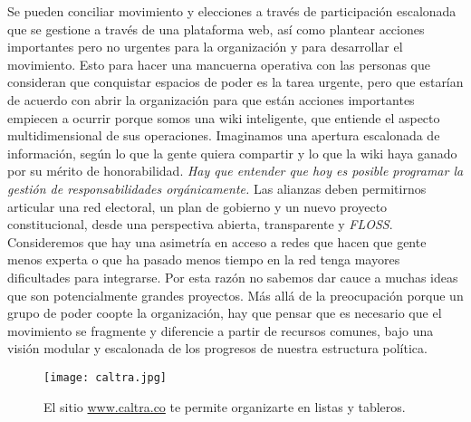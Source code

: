 Se pueden conciliar movimiento y elecciones a través de participación escalonada que se gestione a través de una plataforma web, así como plantear acciones importantes pero no urgentes para la organización y para desarrollar el movimiento. Esto para hacer una mancuerna operativa con las personas que consideran que conquistar espacios de poder es la tarea urgente, pero que estarían de acuerdo con abrir la organización para que están acciones importantes empiecen a ocurrir porque somos una wiki inteligente, que entiende el aspecto multidimensional de sus operaciones. Imaginamos una apertura escalonada de información, según lo que la gente quiera compartir y lo que la wiki haya ganado por su mérito de honorabilidad. \emph{Hay que entender que hoy es posible programar la gestión de responsabilidades orgánicamente.} Las alianzas deben permitirnos articular una red electoral, un plan de gobierno y un nuevo proyecto constitucional, desde una perspectiva abierta, transparente y \emph{FLOSS}. Consideremos que hay una asimetría en acceso a redes que hacen que gente menos experta o que ha pasado menos tiempo en la red tenga mayores dificultades para integrarse. Por esta razón no sabemos dar cauce a muchas ideas que son potencialmente grandes proyectos. Más allá de la preocupación porque un grupo de poder coopte la organización, hay que pensar que es necesario que el movimiento se fragmente y diferencie a partir de recursos comunes, bajo una visión modular y escalonada de los progresos de nuestra estructura política.

\begin{figure}[htbp]
	\centering	\texttt{[image: caltra.jpg]}
	\caption{El sitio \url{www.caltra.co} te permite organizarte en listas y tableros.}
\end{figure}

